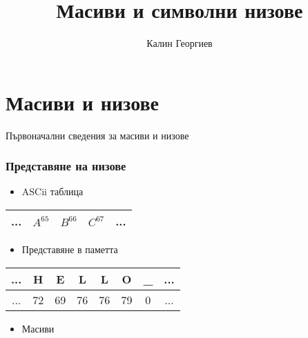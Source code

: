 \documentclass{beamer}
\begin{document}
\title[Увод в програмирането]{Масиви и символни низове} 
\author{Калин Георгиев} 
\frame{\titlepage} 


\section{Масиви и низове} 

\begin{frame}
\centerline{Първоначални сведения за масиви и низове}
\end{frame}

\begin{frame}[fragile]
\frametitle{Представяне на низове}

\begin{itemize}
  \item ASCii таблица 
\end{itemize}

\begin{tabular}{c | c | c | c | c}
\hline
...&$A^{65}$&$B^{66}$&$C^{67}$&... \\\hline
  
\end{tabular}

\pause

\begin{itemize}
  \item Представяне в паметта 
\end{itemize}

\begin{tabular}{c | c | c | c | c | c | c | c}
\hline
...&H &E &L &L &O & \_ &... \\\hline
...&72&69&76&76&79& 0 &... \\\hline
\end{tabular}

\pause
\begin{itemize}
  \item Масиви
\end{itemize}


\end{frame}
\end{document}
